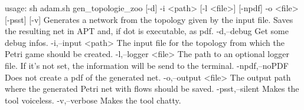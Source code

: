 usage: sh adam.sh gen_topologie_zoo [-d] -i <path> [-l <file>] [-npdf] -o <file> [-psst] [-v]
Generates a network from the topology given by the input file. Saves the resulting net in APT
and, if dot is executable, as pdf.
 -d,--debug           Get some debug infos.
 -i,--input <path>    The input file for the topology from which the Petri game should be
                      created.
 -l,--logger <file>   The path to an optional logger file. If it's not set, the information
                      will be send to the terminal.
 -npdf,--noPDF        Does not create a pdf of the generated net.
 -o,--output <file>   The output path where the generated Petri net with flows should be
                      saved.
 -psst,--silent       Makes the tool voiceless.
 -v,--verbose         Makes the tool chatty.
